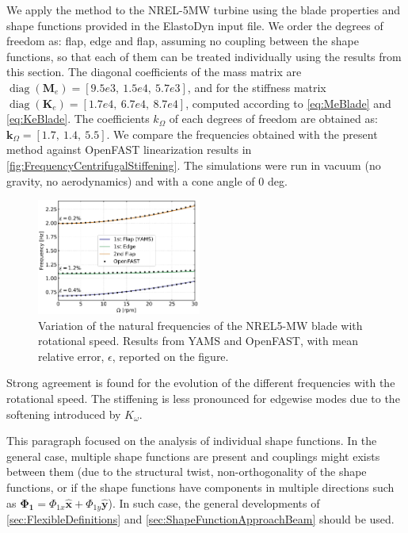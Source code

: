 \documentclass[wes, manuscript]{copernicus}
\renewcommand{\v}[1]{\boldsymbol{#1}}
\newcommand{\m}[1]{\boldsymbol{#1}}
\begin{document}
We apply the method to the NREL-5MW turbine using the blade properties and shape functions provided in the ElastoDyn input file. 
We order the degrees of freedom as:  flap,  edge and  flap, assuming no coupling between the shape functions, so that each of them can be treated individually using the results from this section.
The diagonal coefficients of the mass matrix are $\operatorname{diag}(\m{M}_e) = [9.5e3,\ 1.5e4,\ 5.7e3]$, and for the stiffness matrix
$\operatorname{diag}(\m{K}_e)=[1.7e4,\ 6.7e4,\ 8.7e4]$, computed according to \autoref{eq:MeBlade} and \autoref{eq:KeBlade}. 
The coefficients $k_\Omega$ of each degrees of freedom are obtained as: $\v{k}_\Omega =[1.7,\ 1.4,\ 5.5]$. We compare the frequencies obtained with the present method against OpenFAST linearization results in \autoref{fig:FrequencyCentrifugalStiffening}. The simulations were run in vacuum (no gravity, no aerodynamics) and with a cone angle of 0 deg.
\noindent\begin{figure}[!htb]\centering%
  \includegraphics[width=0.48\textwidth]{figs/FrequencyCentrifugalStiffening.pdf}
  \caption{Variation of the natural frequencies of the NREL5-MW blade with rotational speed. Results from YAMS and OpenFAST, with mean relative error, $\epsilon$, reported on the figure.}\label{fig:FrequencyCentrifugalStiffening}%
\end{figure}
Strong agreement is found for the evolution of the different frequencies with the rotational speed. The stiffening is less pronounced for edgewise modes due to the softening introduced by $K_\omega$.

This paragraph focused on the analysis of individual shape functions. In the general case, multiple shape functions are present and couplings might exists between them (due to the structural twist, non-orthogonality of the shape functions, or if the shape functions have components in multiple directions such as $\v{\Phi_1}=\Phi_{1x}\v{\hat{x}}+\Phi_{1y}\v{\hat{y}}$). In such case, the general developments of 
\autoref{sec:FlexibleDefinitions} and 
\autoref{sec:ShapeFunctionApproachBeam} should be used.
\end{document}
